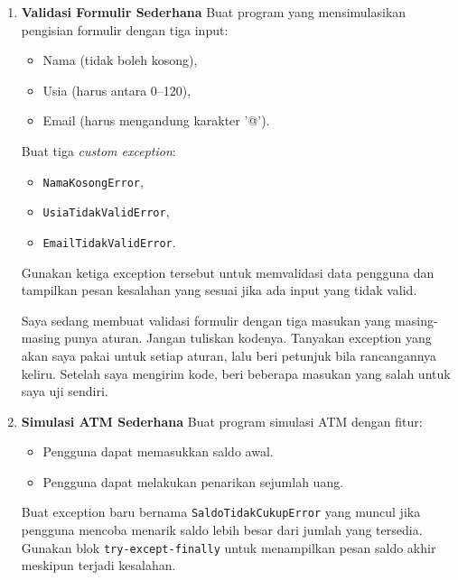 \begin{enumerate}
    \item \textbf{Validasi Formulir Sederhana}  
    Buat program yang mensimulasikan pengisian formulir dengan tiga input:
    \begin{itemize}
        \item Nama (tidak boleh kosong),
        \item Usia (harus antara 0–120),
        \item Email (harus mengandung karakter '@').
    \end{itemize}
    Buat tiga \textit{custom exception}:
    \begin{itemize}
        \item \texttt{NamaKosongError},
        \item \texttt{UsiaTidakValidError},
        \item \texttt{EmailTidakValidError}.
    \end{itemize}
    Gunakan ketiga exception tersebut untuk memvalidasi data pengguna dan tampilkan pesan kesalahan yang sesuai jika ada input yang tidak valid.

      \begin{promptterarah}
      Saya sedang membuat validasi formulir dengan tiga masukan yang masing-masing punya aturan. Jangan tuliskan kodenya. Tanyakan exception yang akan saya pakai untuk setiap aturan, lalu beri petunjuk bila rancangannya keliru. Setelah saya mengirim kode, beri beberapa masukan yang salah untuk saya uji sendiri.
      \end{promptterarah}
    \item \textbf{Simulasi ATM Sederhana}  
    Buat program simulasi ATM dengan fitur:
    \begin{itemize}
        \item Pengguna dapat memasukkan saldo awal.
        \item Pengguna dapat melakukan penarikan sejumlah uang.
    \end{itemize}
    Buat exception baru bernama \texttt{SaldoTidakCukupError} yang muncul jika pengguna mencoba menarik saldo lebih besar dari jumlah yang tersedia.  
    Gunakan blok \texttt{try-except-finally} untuk menampilkan pesan saldo akhir meskipun terjadi kesalahan.


\end{enumerate}
